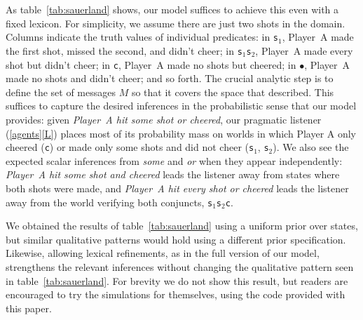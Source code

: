 \documentclass[leqno,12pt]{article}
\newcommand{\tabref}[1]{table~\ref{#1}}
\newcommand{\subeg}[2]{(\ref{#1}\ref{#2})}
\newcommand{\word}[1]{\emph{#1}}
\newcommand{\Messages}{M}
\newcommand{\world}[1]{\texttt{#1}}
\begin{document}
{As \tabref{tab:sauerland} shows, our model suffices to achieve this
even with a fixed lexicon. For simplicity, we assume there are just
two shots in the domain. Columns indicate the truth values of
individual predicates: in \world{s$_{1}$}, Player~A made the first
shot, missed the second, and didn't cheer; in \world{s$_{1}$s$_{2}$},
Player~A made every shot but didn't cheer; in \world{c}, Player~A made
no shots but cheered; in \world{$\bullet$}, Player~A made no shots and
didn't cheer; and so forth. The crucial analytic step is to define the
set of messages $\Messages$ so that it covers the space that
\citeauthor{Sauerland01} described. This suffices to capture the
desired inferences in the probabilistic sense that our model provides:
given \word{Player~A hit some shot or cheered}, our pragmatic listener
\subeg{agents}{L} places most of its probability mass on worlds in
which Player A only cheered (\world{c}) or made only some shots and
did not cheer (\world{s$_1$}, \world{s$_{2}$}). We also see the
expected scalar inferences from \word{some} and \word{or} when they
appear independently: \word{Player~A hit some shot and cheered} leads
the listener away from states where both shots were made, and
\word{Player~A hit every shot or cheered} leads the listener away from
the world verifying both conjuncts, \world{s$_{1}$s$_{2}$c}.

We obtained the results of \tabref{tab:sauerland} using a uniform
prior over states, but similar qualitative patterns would hold using a
different prior specification.  Likewise, allowing lexical
refinements, as in the full version of our model, strengthens the
relevant inferences without changing the qualitative pattern seen in
\tabref{tab:sauerland}. For brevity we do not show this result, but
readers are encouraged to try the simulations for themselves, using
the code provided with this paper.

}
\end{document}
